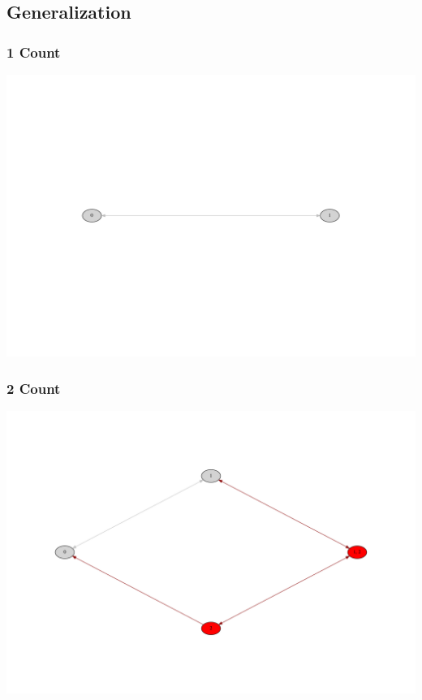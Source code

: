 \documentclass[10pt]{beamer}
\begin{document}
\subsection{Generalization}
\begin{frame}
  \frametitle{1 Count}
  \centering

  \includegraphics[width=\textwidth]{timed_automata/count1.pdf}
\end{frame}

\begin{frame}
  \frametitle{2 Count}
  \centering

  \includegraphics[width=\textwidth]{timed_automata/count2.pdf}
\end{frame}
\end{document}
